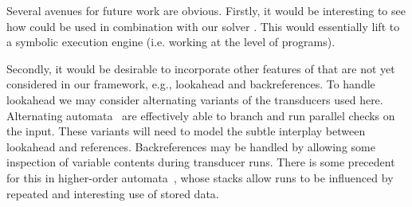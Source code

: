 

%

Several avenues for future work are obvious. Firstly, it would be interesting to
see how \expose{} could be used in combination with our solver \ostrich{}. This
would essentially lift \ostrich{} to a symbolic execution engine (i.e. working
at the level of programs).

Secondly, it would be desirable to incorporate other features of \regexp{} that
are not yet considered in our framework, e.g., lookahead and backreferences.
To handle lookahead we may consider alternating variants of the transducers used here.
Alternating automata~\cite{CKS81} are effectively able to branch and run parallel checks on the input.
These variants will need to model the subtle interplay between lookahead and references.
Backreferences may be handled by allowing some inspection of variable contents during transducer runs.
There is some precedent for this in higher-order automata~\cite{M76,E91}, whose stacks allow runs to be influenced by repeated and interesting use of stored data.

